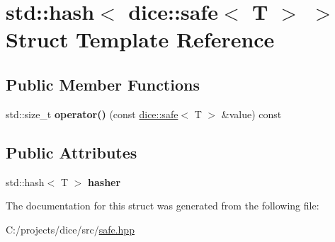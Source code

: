 \hypertarget{structstd_1_1hash_3_01dice_1_1safe_3_01T_01_4_01_4}{}\section{std\+:\+:hash$<$ dice\+:\+:safe$<$ T $>$ $>$ Struct Template Reference}
\label{structstd_1_1hash_3_01dice_1_1safe_3_01T_01_4_01_4}
\subsection*{Public Member Functions}
\begin{DoxyCompactItemize}
\item 
\mbox{\label{structstd_1_1hash_3_01dice_1_1safe_3_01T_01_4_01_4_aa5c468b6494a69dbc2aabb873e068119}} 
std\+::size\+\_\+t {\bfseries operator()} (const \mbox{\hyperlink{safe_8hpp_acd796e346e2b746739435c4a2983edba}{dice\+::safe}}$<$ T $>$ \&value) const
\end{DoxyCompactItemize}
\subsection*{Public Attributes}
\begin{DoxyCompactItemize}
\item 
\mbox{\label{structstd_1_1hash_3_01dice_1_1safe_3_01T_01_4_01_4_afdb7f9c99526bff85493fd38216a6225}} 
std\+::hash$<$ T $>$ {\bfseries hasher}
\end{DoxyCompactItemize}


The documentation for this struct was generated from the following file\+:\begin{DoxyCompactItemize}
\item 
C\+:/projects/dice/src/\mbox{\hyperlink{safe_8hpp}{safe.\+hpp}}\end{DoxyCompactItemize}
